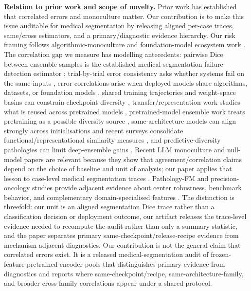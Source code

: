 \documentclass{article}
\begin{document}
\textbf{Relation to prior work and scope of novelty.} Prior work has established that correlated errors and monoculture matter. Our contribution is to make this issue auditable for medical segmentation by releasing aligned per-case traces, same/cross estimators, and a primary/diagnostic evidence hierarchy. Our risk framing follows algorithmic-monoculture and foundation-model ecosystem work \citep{kleinberg2021monoculture,bommasani2021foundation,bommasani2022picking,toups2023ecosystem}. The correlation gap we measure has modelling antecedents: pairwise Dice between ensemble samples is the established medical-segmentation failure-detection estimator \citep{roy2019bayesian,zenk2024medseg}; trial-by-trial error consistency asks whether systems fail on the same inputs \citep{geirhos2020errorconsistency}, error correlations arise when deployed models share algorithms, datasets, or foundation models \citep{li2025quantifying}, shared training trajectories and weight-space basins can constrain checkpoint diversity \citep{fort2019loss,wortsman2022soups}, transfer/representation work studies what is reused across pretrained models \citep{neyshabur2020what,gontijolopes2022norep}, pretrained-model ensemble work treats pretraining as a possible diversity source \citep{deepensemble_transfer2020}, same-architecture models can align strongly across initialisations and recent surveys consolidate functional/representational similarity measures \citep{kornblith2019similarity,klabunde2024similarity}, and predictive-diversity pathologies can limit deep-ensemble gains \citep{abe2023pathologies}. Recent LLM monoculture and null-model papers are relevant because they show that agreement/correlation claims depend on the choice of baseline and unit of analysis; our paper applies that lesson to case-level medical segmentation traces \citep{jiang2025hivemind,kim2025correlated,gorecki2025monoculture,goel2025greatmodels,subjectivity2026}. Pathology-FM and precision-oncology studies provide adjacent evidence about center robustness, benchmark behavior, and complementary domain-specialised features \citep{dejong2025pathologyrobust,campanella2025clinical,luo2025elf,neidlinger2025benchmarking}. The distinction is threefold: our unit is an aligned segmentation Dice trace rather than a classification decision or deployment outcome, our artifact releases the trace-level evidence needed to recompute the audit rather than only a summary statistic, and the paper separates primary same-checkpoint/release-recipe evidence from mechanism-adjacent diagnostics. Our contribution is not the general claim that correlated errors exist. It is a released medical-segmentation audit of frozen-feature pretrained-encoder pools that distinguishes primary evidence from diagnostics and reports where same-checkpoint/recipe, same-architecture-family, and broader cross-family correlations appear under a shared protocol.
\end{document}
